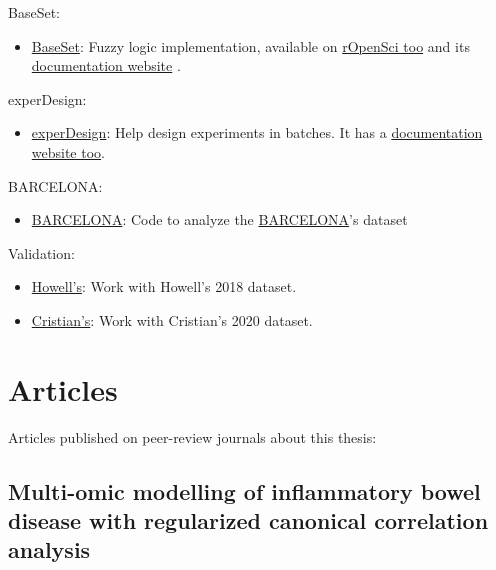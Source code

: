 \documentclass[
  12pt,
  a4paper,
  twoside,
  openright]{book}
\providecommand{\tightlist}{%
  \setlength{\itemsep}{0pt}\setlength{\parskip}{0pt}}
\begin{document}
BaseSet:

\begin{itemize}
\tightlist
\item
  \href{https://cran.r-project.org/package=BaseSet}{BaseSet}: Fuzzy logic implementation, available on \href{https://github.com/ropensci/BaseSet}{rOpenSci too} and its \href{https://docs.ropensci.org/BaseSet}{documentation website} .
\end{itemize}

experDesign:

\begin{itemize}
\tightlist
\item
  \href{https://cran.r-project.org/package=experDesign}{experDesign}: Help design experiments in batches. It has a \href{https://experDesign.llrs.dev/}{documentation website too}.
\end{itemize}

BARCELONA:

\begin{itemize}
\tightlist
\item
  \href{https://github.com/llrs/Barcelona}{BARCELONA}: Code to analyze the \protect\hyperlink{acronyms_BARCELONA}{BARCELONA}'s dataset
\end{itemize}

Validation:

\begin{itemize}
\tightlist
\item
  \href{https://github.com/llrs/howell_2018}{Howell's}: Work with Howell's 2018 dataset.
\item
  \href{https://github.com/llrs/cristian_mark}{Cristian's}: Work with Cristian's 2020 dataset.
\end{itemize}

\hypertarget{articles}{%
\chapter{Articles}\label{articles}}

Articles published on peer-review journals about this thesis:

\hypertarget{app-multiomics}{%
\section{Multi-omic modelling of inflammatory bowel disease with regularized canonical correlation analysis}\label{app-multiomics}}

\end{document}
